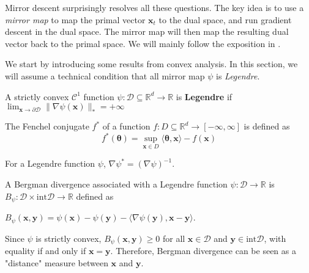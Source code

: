 \documentclass[12pt, a4paper]{report}
\begin{document}
Mirror descent \cite{Yudin1983Mirror, Beck2003MirrorDA} surprisingly resolves all these questions. The key idea is to use a \textit{mirror map} to map the primal vector $\mathbf{x}_t$ to the dual space, and run gradient descent in the dual space. The mirror map will then map the resulting dual vector back to the primal space. We will mainly follow the exposition in \cite{Orabona2019OnlineLearning}.

We start by introducing some results from convex analysis. In this section, we will assume a technical condition that all mirror map $\psi$ is \textit{Legendre}.
\begin{defn}
A strictly convex $\mathcal{C}^1$ function $\psi : \mathcal{D} \subseteq \mathbb{R}^d \rightarrow \mathbb{R}$ is \textbf{Legendre} if $\lim_{\mathbf{x} \rightarrow \partial \mathcal{D}} \lVert \nabla \psi(\mathbf{x}) \rVert_* = +\infty$
\end{defn}

\begin{defn}
The Fenchel conjugate $f^{*}$ of a function $f : D \subseteq \mathbb{R}^d \rightarrow [-\infty, \infty]$ is defined as
\begin{equation*}
    f^{*}(\mathbf{\theta}) = \sup_{\mathbf{x} \in D} \langle \mathbf{\theta}, \mathbf{x} \rangle - f(\mathbf{x})
\end{equation*}
\end{defn}

\begin{prop} \label{prop:legendre-inverse}
For a Legendre function $\psi$, $\nabla \psi^{*} = (\nabla \psi)^{-1}$.
\end{prop}

\begin{defn}
A Bergman divergence associated with a Legendre function $\psi : \mathcal{D} \rightarrow \mathbb{R}$ is $B_\psi : \mathcal{D} \times \mathrm{int} \mathcal{D} \rightarrow \mathbb{R}$ defined as
\begin{center}
    $B_\psi(\mathbf{x}, \mathbf{y}) = \psi(\mathbf{x}) - \psi(\mathbf{y}) - \langle \nabla \psi(\mathbf{y}), \mathbf{x} - \mathbf{y} \rangle$.
\end{center}
\end{defn}

Since $\psi$ is strictly convex, $B_\psi(\mathbf{x}, \mathbf{y}) \geq 0$ for all $\mathbf{x} \in \mathcal{D}$ and $\mathbf{y} \in \mathrm{int} \mathcal{D}$, with equality if and only if $\mathbf{x} = \mathbf{y}$. Therefore, Bergman divergence can be seen as a "distance" measure between $\mathbf{x}$ and $\mathbf{y}$. 
\end{document}
